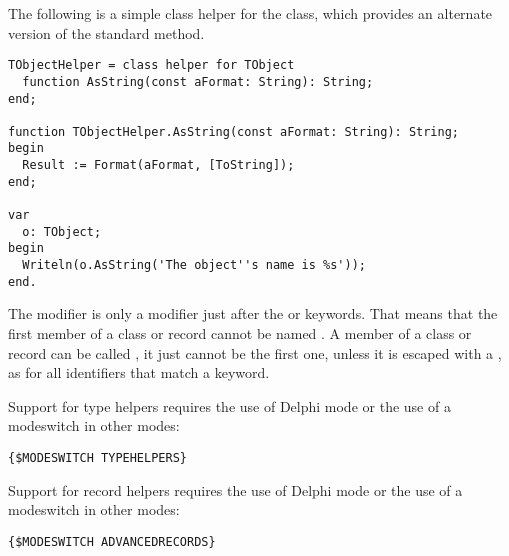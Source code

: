 The following is a simple class helper for the  class, which provides
an alternate version of the standard  method.
\begin{verbatim}
TObjectHelper = class helper for TObject
  function AsString(const aFormat: String): String;
end;

function TObjectHelper.AsString(const aFormat: String): String;
begin
  Result := Format(aFormat, [ToString]);
end;

var
  o: TObject;
begin
  Writeln(o.AsString('The object''s name is %s'));
end.
\end{verbatim}

\begin{remark}
The  modifier is only a modifier just after the  or
 keywords. That means that the first member of a class or record
cannot be named . A member of a class or record can be called
, it just cannot be the first one, unless it is escaped with a
\var{\&}, as for all identifiers that match a keyword.
\end{remark}

\begin{remark}
Support for type helpers requires the use of Delphi mode or the use of a
 modeswitch in other modes:
\begin{verbatim}
{$MODESWITCH TYPEHELPERS}
\end{verbatim}
\end{remark}

\begin{remark}
Support for record helpers requires the use of Delphi mode or the use of a
 modeswitch in other modes:
\begin{verbatim}
{$MODESWITCH ADVANCEDRECORDS}
\end{verbatim}
\end{remark}


